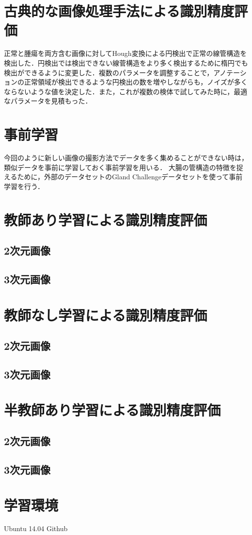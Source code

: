 \section{古典的な画像処理手法による識別精度評価}
正常と腫瘍を両方含む画像に対してHough変換による円検出で正常の線管構造を検出した．円検出では検出できない線菅構造をより多く検出するために楕円でも検出ができるように変更した．複数のパラメータを調整することで，アノテーションの正常領域が検出できるような円検出の数を増やしながらも，ノイズが多くならないような値を決定した．また，これが複数の検体で試してみた時に，最適なパラメータを見積もった．

\section{事前学習}
今回のように新しい画像の撮影方法でデータを多く集めることができない時は，類似データを事前に学習しておく事前学習を用いる．
大腸の管構造の特徴を捉えるために，外部のデータセットのGland Challengeデータセットを使って事前学習を行う．

\section{教師あり学習による識別精度評価}
\subsection*{2次元画像}
\subsection*{3次元画像}

\section{教師なし学習による識別精度評価}
\subsection*{2次元画像}
\subsection*{3次元画像}

\section{半教師あり学習による識別精度評価}
\subsection*{2次元画像}
\subsection*{3次元画像}

\section{学習環境}
Ubuntu 14.04
Github
